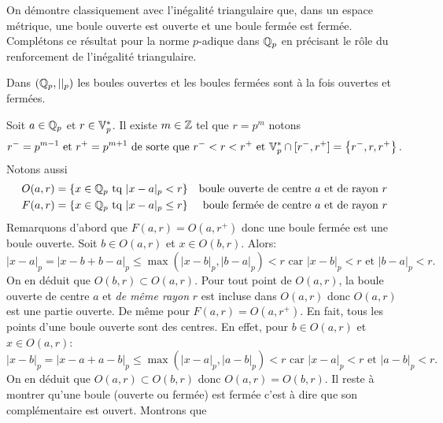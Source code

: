 \noindent On démontre classiquement avec l'inégalité triangulaire que, dans un espace métrique, une boule ouverte est ouverte et une boule fermée est fermée. Complétons ce résultat pour la norme $p$-adique dans $\mathbb{Q}_p$ en précisant le rôle du renforcement de l'inégalité triangulaire. \label{prop:BoulesP-ad}
\begin{prop}
 Dans $(\mathbb{Q}_p, ||_p)$ les boules ouvertes et les boules fermées sont à la fois ouvertes et fermées.
\end{prop}
\begin{demo}
Soit $a\in \mathbb{Q}_p$ et $r\in\mathbb{V}_p^*$. Il existe $m \in \mathbb{Z}$ tel que $r= p^{m}$ notons
\begin{displaymath}
 r^- = p ^{m-1} \text{ et } r^+ = p ^{m+1} \text{ de sorte que } r^- < r < r^+ \text{ et }\mathbb{V}_p^* \cap [r^-, r^+] = \left\lbrace r^-, r, r^+\right\rbrace.
\end{displaymath}
Notons aussi
\begin{align*}
 O(a,r) &= \left\lbrace x \in\mathbb{Q}_p \text{ tq } |x-a|_p < r \right\rbrace &\text{boule ouverte de centre $a$ et de rayon $r$} \\
 F(a,r) &= \left\lbrace x \in\mathbb{Q}_p \text{ tq } |x-a|_p \leq r \right\rbrace &\text{boule fermée de centre $a$ et de rayon $r$}
\end{align*}
Remarquons d'abord que $F(a,r) = O(a,r^+)$ donc une boule fermée est une boule ouverte.\newline
Soit $b\in O(a,r)$ et $x\in O(b,r)$. Alors:
\begin{displaymath}
 |x-a|_p = |x-b + b-a|_p \leq \max(|x-b|_p,|b-a|_p) < r \text{ car } |x-b|_p < r \text{ et } |b-a|_p < r.
\end{displaymath}
On en déduit que $O(b,r)\subset O(a,r)$. Pour tout point de $O(a,r)$, la boule ouverte de centre $a$ et \emph{de même rayon } $r$ est incluse dans $O(a,r)$ donc $O(a,r)$ est une partie ouverte. De même pour $F(a,r) = O(a,r^+)$.\newline
En fait, tous les points d'une boule ouverte sont des centres. En effet, pour $b\in O(a,r)$ et $x\in O(a,r)$:
\begin{displaymath}
 |x-b|_p = |x-a + a-b|_p \leq \max(|x-a|_p,|a-b|_p) < r \text{ car } |x-a|_p < r \text{ et } |a-b|_p < r.
\end{displaymath}
On en déduit que $O(a,r)\subset O(b,r)$ donc $O(a,r) = O(b,r)$.\newline
Il reste à montrer qu'une boule (ouverte ou fermée) est fermée c'est à dire que son complémentaire est ouvert. Montrons que
\begin{displaymath}

\end{displaymath}
\end{demo}

